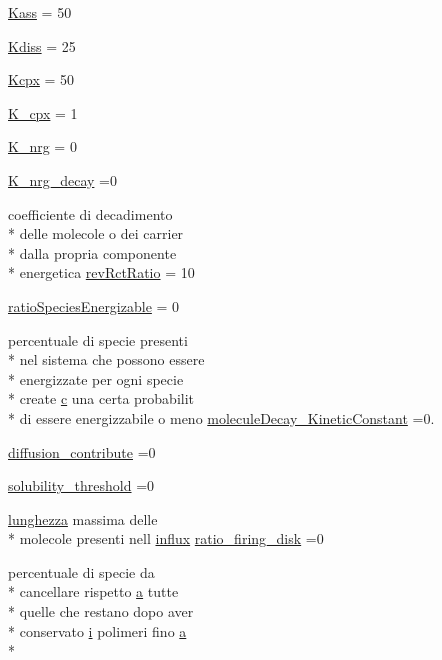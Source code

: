 \begin{DoxyCompactItemize}
\hyperlink{a00113_a484afe97369bc993daaa71613dd2a665}{Kass} = 50
\item 
\hyperlink{a00113_a51a314f9df0eaa4488a1b264d1de0173}{Kdiss} = 25
\item 
\hyperlink{a00113_aaea32371e0f1645dcea44ce4d4a3d147}{Kcpx} = 50
\item 
\hyperlink{a00113_a26dbdfeb290332837753db666ee56981}{K\-\_\-cpx} = 1
\item 
\hyperlink{a00113_ac8f2b2a8d859ca2b7cf056575c7b0538}{K\-\_\-nrg} = 0
\item 
\hyperlink{a00113_abd02c282e86e2173abc6daed03f73584}{K\-\_\-nrg\-\_\-decay} =0
\item 
coefficiente di decadimento \\*
delle molecole o dei carrier \\*
dalla propria componente \\*
energetica \hyperlink{a00113_aa7d97d27bd1a172a2f0ad49ef13ef8ac}{rev\-Rct\-Ratio} = 10
\item 
\hyperlink{a00113_a1fa680d8b3a4f885d99f56fef41d2c37}{ratio\-Species\-Energizable} = 0
\item 
percentuale di specie presenti \\*
nel sistema che possono essere \\*
energizzate per ogni specie \\*
create \hyperlink{a00035_a6be92348ba85ef257b11d06209e1d7b6}{c} una certa probabilit \\*
di essere energizzabile o meno \hyperlink{a00113_a85569bbcfd8fbc0081b5a144eaf516f5}{molecule\-Decay\-\_\-\-Kinetic\-Constant} =0.
\item 
\hyperlink{a00113_a9341167cb56ed18499df723220990b9c}{diffusion\-\_\-contribute} =0
\item 
\hyperlink{a00113_acbefa7c9bfd826fec9b32fa3bd29c288}{solubility\-\_\-threshold} =0
\item 
\hyperlink{a00106_a984d293145d85a936f430c0990316e51}{lunghezza} massima delle \\*
molecole presenti nell \hyperlink{a00107_a902e747aeec6b345d3a057099152f41f}{influx} \hyperlink{a00113_a83c1660d71068ae836121af0890bb3dd}{ratio\-\_\-firing\-\_\-disk} =0
\item 
percentuale di specie da \\*
cancellare rispetto \hyperlink{a00035_a2ffdbad9ea59541e59cbd2b938e0770c}{a} tutte \\*
quelle che restano dopo aver \\*
conservato \hyperlink{a00113_ad3efca1ea6e3333daf30719ee0501862}{i} polimeri fino \hyperlink{a00035_a2ffdbad9ea59541e59cbd2b938e0770c}{a} \\*

\end{DoxyCompactItemize}

